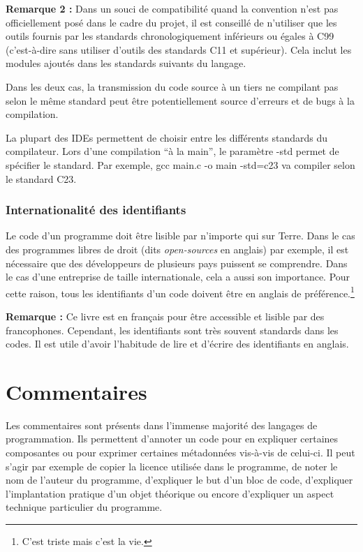 \documentclass[../../../main.tex]{subfiles}
\begin{document}
\textbf{Remarque 2 :} Dans un souci de compatibilité quand la convention n'est pas officiellement posé dans le cadre du projet, il est conseillé de n'utiliser que les outils fournis par les standards chronologiquement inférieurs ou égales à C99 (c'est-à-dire sans utiliser d'outils des standards C11 et supérieur). Cela inclut les modules ajoutés dans les standards suivants du langage.
 
Dans les deux cas, la transmission du code source à un tiers ne compilant pas selon le même standard peut être potentiellement source d'erreurs et de bugs à la compilation.
 
La plupart des IDEs permettent de choisir entre les différents standards du compilateur. Lors d'une compilation ``à la main'', le paramètre \textsf{-std} permet de spécifier le standard. Par exemple, \textsf{gcc main.c -o main -std=c23} va compiler selon le standard C23.
 
\subsubsection{Internationalité des identifiants}
\label{ssub:internationalit_des_identifiants}
Le code d'un programme doit être lisible par n'importe qui sur Terre. Dans le cas des programmes libres de droit (dits \textit{open-sources} en anglais) par exemple, il est nécessaire que des développeurs de plusieurs pays puissent se comprendre. Dans le cas d'une entreprise de taille internationale, cela a aussi son importance. Pour cette raison, tous les identifiants d'un code doivent être en anglais de préférence.\footnote{C'est triste mais c'est la vie.}

\textbf{Remarque :} Ce livre est en français pour être accessible et lisible par des francophones. Cependant, les identifiants sont très souvent standards dans les codes. Il est utile d'avoir l'habitude de lire et d'écrire des identifiants en anglais.
\section{Commentaires}\label{sec:commentaires}
Les commentaires sont présents dans l'immense majorité des langages de programmation. Ils permettent d'annoter un code pour en expliquer certaines composantes ou pour exprimer certaines métadonnées vis-à-vis de celui-ci. Il peut s'agir par exemple de copier la licence utilisée dans le programme, de noter le nom de l'auteur du programme, d'expliquer le but d'un bloc de code, d'expliquer l'implantation pratique d'un objet théorique ou encore d'expliquer un aspect technique particulier du programme.
 
\end{document}
